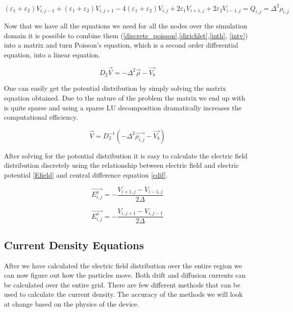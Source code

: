 \begin{equation}
(\varepsilon_1+\varepsilon_2)V_{i,j-1}+(\varepsilon_1+\varepsilon_2)V_{i,j+1}-4(\varepsilon_1+\varepsilon_2)V_{i,j}+2\varepsilon_1 V_{i+1,j}+2\varepsilon_2 V_{i-1,j}=Q_{i,j}=\Delta^2\rho_{i,j}
\label{intv}
\end{equation}

Now that we have all the equations we need for all the nodes over the simulation domain it is possible to combine them (\eqref{discrete_poisson},\eqref{dirichlet},\eqref{inth}, \eqref{intv}) into a matrix and turn Poisson's equation, which is a second order differential equation, into a linear equation.

\begin{equation}
D_{2}\vec{V}=-\Delta^2\vec{\rho}-\vec{V_b}
\end{equation}

One can easily get the potential distribution by simply solving the matrix equation obtained. Due to the nature of the problem the matrix we end up with is quite sparse and using a sparse LU decomposition dramatically increases the computational efficiency.

\begin{equation}
\vec{V}=D_{2}^{-1}(-\Delta^2\vec{\rho_{i,j}}-\vec{V_b})
\end{equation}

After solving for the potential distribution it is easy to calculate the electric field distribution discretely using the relationship between electric field and electric potential \eqref{Efield} and central difference equation \eqref{cdif}. 

\begin{equation}
\vec{E^x_{i,j}}=-\frac{V_{i+1,j}-V_{i-1,j}}{2\Delta}
\end{equation}

\begin{equation}
\vec{E^x_{i,j}}=-\frac{V_{i,j+1}-V_{i,j-1}}{2\Delta}
\end{equation}

\clearpage
\subsection{Current Density Equations}
After we have calculated the electric field distribution over the entire region we can now figure out how the particles move. Both drift and diffusion currents can be calculated over the entire grid. There are few different methods that can be used to calculate the current density. The accuracy of the methods we will look at change based on the physics of the device.
